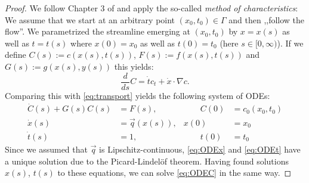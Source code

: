 \documentclass[paper=a4, fontsize=12pt,parskip=half,draft,headings=small]{scrartcl}
\newcommand{\q}{\vec{q}}
\begin{document}
		\begin{proof}
			We follow Chapter 3 of \cite{Evans98} and apply the so-called \emph{method of characteristics}:
			We assume that we start at an arbitrary point $(x_0,t_0) \in \Gamma$ and then ,,follow the flow''.
			We parametrized the streamline emerging at $(x_0,t_0)$ by $x = x(s)$ as well as $t = t(s)$ where $x(0)=x_0$ as well as $t(0)=t_0$ (here $s \in [0,\infty)$).
			If we define $C(s):= c(x(s),t(s))$, $F(s):=f(x(s),t(s))$ and $G(s):=g(x(s),y(s))$ this yields:
			\[
				\frac{d}{ds} C = \dot{t} c_t + \dot{x} \cdot \nabla c.
			\]
			Comparing this with \eqref{eq:transport} yields the following system of ODEs:
			\begin{subequations}
			\begin{alignat}{2}
				\dot{C}(s) + G(s)C(s) &= F(s), & \qquad  C(0) &= c_0(x_0,t_0) \label{eq:ODEC}\\
				\dot{x}(s) &= \q(x(s)),&  x(0) &= x_0 \label{eq:ODEx}\\
				\dot{t}(s) &= 1, & \qquad  t(0) &= t_0 \label{eq:ODEt}
			\end{alignat}
			\end{subequations}
			Since we assumed that $\q$ is Lipschitz-continuous, \eqref{eq:ODEx} and \eqref{eq:ODEt} have a unique solution due to the Picard-Lindelöf theorem.
			Having found solutions $x(s)$, $t(s)$ to these equations, we can solve \eqref{eq:ODEC} in the same way.
			

\end{proof}
\end{document}
